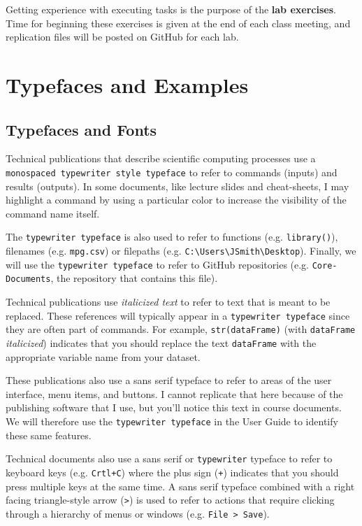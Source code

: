 \documentclass[]{book}
\theoremstyle{definition}
\theoremstyle{definition}
\theoremstyle{remark}
\begin{document}
Getting experience with executing tasks is the purpose of the
\textbf{lab exercises}. Time for beginning these exercises is given at
the end of each class meeting, and replication files will be posted on
GitHub for each lab.

\section{Typefaces and Examples}\label{typefaces-and-examples}

\subsection{Typefaces and Fonts}\label{typefaces-and-fonts}

Technical publications that describe scientific computing processes use
a \texttt{monospaced\ typewriter\ style\ typeface} to refer to commands
(inputs) and results (outputs). In some documents, like lecture slides
and cheat-sheets, I may highlight a command by using a particular color
to increase the visibility of the command name itself.

The \texttt{typewriter\ typeface} is also used to refer to functions
(e.g. \texttt{library()}), filenames (e.g. \texttt{mpg.csv}) or
filepaths (e.g.
\texttt{C:\textbackslash{}Users\textbackslash{}JSmith\textbackslash{}Desktop}).
Finally, we will use the \texttt{typewriter\ typeface} to refer to
GitHub repositories (e.g. \texttt{Core-Documents}, the repository that
contains this file).

Technical publications use \emph{italicized text} to refer to text that
is meant to be replaced. These references will typically appear in a
\texttt{typewriter\ typeface} since they are often part of commands. For
example, \texttt{str(dataFrame)} (with \texttt{dataFrame}
\emph{italicized}) indicates that you should replace the text
\texttt{dataFrame} with the appropriate variable name from your dataset.

These publications also use a sans serif typeface to refer to areas of
the user interface, menu items, and buttons. I cannot replicate that
here because of the publishing software that I use, but you'll notice
this text in course documents. We will therefore use the
\texttt{typewriter\ typeface} in the User Guide to identify these same
features.

Technical documents also use a sans serif or \texttt{typewriter}
typeface to refer to keyboard keys (e.g. \texttt{Crtl+C}) where the plus
sign (\texttt{+}) indicates that you should press multiple keys at the
same time. A sans serif typeface combined with a right facing
triangle-style arrow (\texttt{\textgreater{}}) is used to refer to
actions that require clicking through a hierarchy of menus or windows
(e.g. \texttt{File\ \textgreater{}\ Save}).
\end{document}
